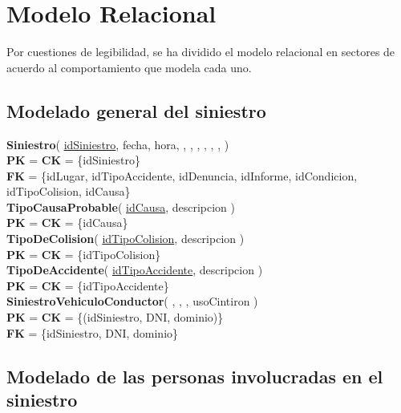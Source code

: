 \section{Modelo Relacional}
\small

Por cuestiones de legibilidad, se ha dividido el modelo relacional en sectores
    de acuerdo al comportamiento que modela cada uno.

\subsection{Modelado general del siniestro}

\textbf{Siniestro}(
    \uline{idSiniestro},
    fecha,
    hora,
    ,
    ,
    ,
    ,
    ,
    ,
)\\
\textbf{PK} = \textbf{CK} = \{idSiniestro\}\\
\textbf{FK} = \{idLugar, idTipoAccidente, idDenuncia, idInforme, idCondicion, idTipoColision, idCausa\}\\

\textbf{TipoCausaProbable}(
    \uline{idCausa},
    descripcion
)\\
\textbf{PK} = \textbf{CK} = \{idCausa\}\\

\textbf{TipoDeColision}(
    \uline{idTipoColision},
    descripcion
)\\
\textbf{PK} = \textbf{CK} = \{idTipoColision\}\\

\textbf{TipoDeAccidente}(
    \uline{idTipoAccidente},
    descripcion
)\\
\textbf{PK} = \textbf{CK} = \{idTipoAccidente\}\\


\textbf{SiniestroVehiculoConductor}(
    ,
    ,
    ,
    usoCintiron
)\\
\textbf{PK} = \textbf{CK} = \{(idSiniestro, DNI, dominio)\}\\
\textbf{FK} = \{idSiniestro, DNI, dominio\}\\


\subsection{Modelado de las personas involucradas en el siniestro}


